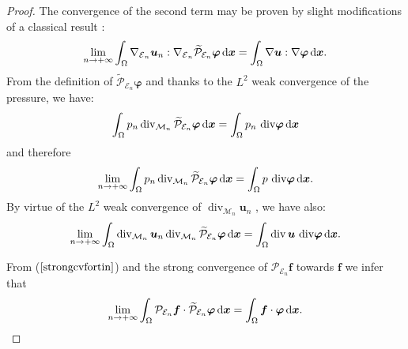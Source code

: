 \documentclass{amsart}
\numberwithin{equation}{section}
\begin{document}
\begin{proof}
The convergence of the second term may be proven by slight modifications of a classical result \cite[Chapter III]{eymard2000finite}:
\[
\lim_{{n {\rightarrow} + \infty}}
\int_\Omega   \nabla_{\operatorname{{\mathcal{E}}}_n} {{\boldsymbol u}}_n : \nabla_{\operatorname{{\mathcal{E}}}_n} \widetilde{\mathcal P}_{{{\mathcal E}}_n}{{\boldsymbol \varphi}}{\, {\rm d}{{\boldsymbol x}}} = \int_\Omega \nabla {{\boldsymbol u}} : \nabla {{\boldsymbol \varphi}} {\, {\rm d}{{\boldsymbol x}}}.
\]
From the definition of $\widetilde{\mathcal P}_{{{\mathcal E}}_n} {{\boldsymbol \varphi}}$ and thanks to the $L^2$ weak convergence of the pressure, we have:
\[
 \int_\Omega  p_n \operatorname{div}_{{{\mathcal M}}_n}  \widetilde{\mathcal P}_{{{\mathcal E}}_n}{{\boldsymbol \varphi}}  {\, {\rm d}{{\boldsymbol x}}} =
\int_\Omega p_n\ {{\rm div}} {{\boldsymbol \varphi}} {\, {\rm d}{{\boldsymbol x}}}
\]
and therefore
\[ \lim_{{n {\rightarrow} + \infty}} \int_\Omega p_n \operatorname{div}_{{{\mathcal M}}_n} \widetilde{\mathcal P}_{{{\mathcal E}}_n}{{\boldsymbol \varphi}} {\, {\rm d}{{\boldsymbol x}}} = \int_\Omega p\ {{\rm div}} {{\boldsymbol \varphi}} {\, {\rm d}{{\boldsymbol x}}}.
\]
By virtue of the $L^2$ weak convergence of $ \operatorname{div}_{{{\mathcal M}}_n} {{\boldsymbol u}}_n$ , we have also:
\begin{equation*}
\lim_{{n {\rightarrow} + \infty}} \int_\Omega \operatorname{div}_{{{\mathcal M}}_n} {{\boldsymbol u}}_n \operatorname{div}_{{{\mathcal M}}_n}  \widetilde{\mathcal P}_{{{\mathcal E}}_n}{{\boldsymbol \varphi}} {\, {\rm d}{{\boldsymbol x}}} = \int_\Omega \operatorname{div} {{\boldsymbol u}} \ {{\rm div}} {{\boldsymbol \varphi}} {\, {\rm d}{{\boldsymbol x}}}.
\end{equation*}

From ($\ref{strongcvfortin}$) and the strong convergence of $ {{\mathcal P}}_{\operatorname{{\mathcal{E}}}_n} \bm{f} $ towards $\bm{f}$  we infer that \begin{equation*} \lim_{{n {\rightarrow} + \infty}} \int_\Omega \mathcal{P}_{{{\mathcal E}}_n}\bm{f}  \cdot   \widetilde{\mathcal P}_{{{\mathcal E}}_n}{{\boldsymbol \varphi}} {\, {\rm d}{{\boldsymbol x}}}= \int_\Omega {{\boldsymbol f}} \cdot {{\boldsymbol \varphi}} {\, {\rm d}{{\boldsymbol x}}}. 
\end{equation*}


\end{proof}
\end{document}
